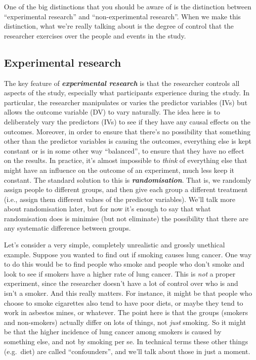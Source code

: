\documentclass[
]{book}
\begin{document}
One of the big distinctions that you should be aware of is the distinction between ``experimental research'' and ``non-experimental research''. When we make this distinction, what we're really talking about is the degree of control that the researcher exercises over the people and events in the study.

\hypertarget{experimental-research}{%
\subsection{Experimental research}\label{experimental-research}}

The key feature of \textbf{\emph{experimental research}} is that the researcher controls all aspects of the study, especially what participants experience during the study. In particular, the researcher manipulates or varies the predictor variables (IVs) but allows the outcome variable (DV) to vary naturally. The idea here is to deliberately vary the predictors (IVs) to see if they have any causal effects on the outcomes. Moreover, in order to ensure that there's no possibility that something other than the predictor variables is causing the outcomes, everything else is kept constant or is in some other way ``balanced'', to ensure that they have no effect on the results. In practice, it's almost impossible to \emph{think} of everything else that might have an influence on the outcome of an experiment, much less keep it constant. The standard solution to this is \textbf{\emph{randomisation}}. That is, we randomly assign people to different groups, and then give each group a different treatment (i.e., assign them different values of the predictor variables). We'll talk more about randomisation later, but for now it's enough to say that what randomisation does is minimise (but not eliminate) the possibility that there are any systematic difference between groups.

Let's consider a very simple, completely unrealistic and grossly unethical example. Suppose you wanted to find out if smoking causes lung cancer. One way to do this would be to find people who smoke and people who don't smoke and look to see if smokers have a higher rate of lung cancer. This is \emph{not} a proper experiment, since the researcher doesn't have a lot of control over who is and isn't a smoker. And this really matters. For instance, it might be that people who choose to smoke cigarettes also tend to have poor diets, or maybe they tend to work in asbestos mines, or whatever. The point here is that the groups (smokers and non-smokers) actually differ on lots of things, not \emph{just} smoking. So it might be that the higher incidence of lung cancer among smokers is caused by something else, and not by smoking per se. In technical terms these other things (e.g.~diet) are called ``confounders'', and we'll talk about those in just a moment.
\end{document}
